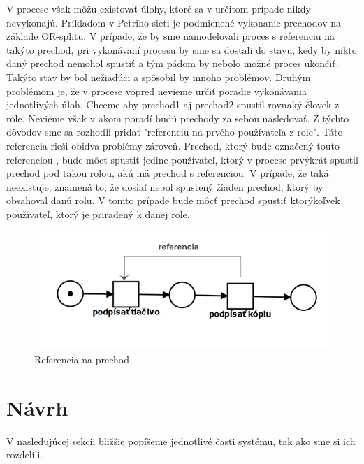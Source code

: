 V procese však môžu existovať úlohy, ktoré sa v určitom prípade nikdy nevykonajú. Príkladom v Petriho sieti je podmienené vykonanie prechodov na základe OR-splitu. V prípade, že by sme namodelovali proces s referenciu na takýto prechod, pri vykonávaní procesu by sme sa dostali do stavu, kedy by nikto daný prechod nemohol spustiť a tým pádom by nebolo možné proces ukončiť. Takýto stav by bol nežiadúci a spôsobil by mnoho problémov. Druhým problémom je, že v procese vopred nevieme určiť poradie vykonávania jednotlivých úloh. Chceme aby prechod1 aj prechod2 spustil rovnaký človek z role. Nevieme však v akom poradí budú prechody za sebou nasledovať. Z týchto dôvodov sme sa rozhodli pridať "referenciu na prvého používateľa z role". Táto referencia rieši obidva problémy zároveň. Prechod, ktorý bude označený touto referenciou , bude môcť spustiť jedine používateľ, ktorý v procese prvýkrát spustil prechod pod takou rolou, akú má prechod s referenciou. V prípade, že taká neexistuje, znamená to, že dosiaľ nebol spustený žiaden prechod, ktorý by obsahoval danú rolu. V tomto prípade bude môcť prechod spustiť ktorýkoľvek používateľ, ktorý je priradený k danej role.

\begin{figure}[h]
	\centering
	\includegraphics[width=0.7\linewidth]{images/referencia}
	\caption{Referencia na prechod}
	\label{fig:referencia na prvého z role}
\end{figure}




\section{Návrh}
V nasledujúcej sekcii bližšie popíšeme jednotlivé časti systému, tak ako sme si ich rozdelili.

